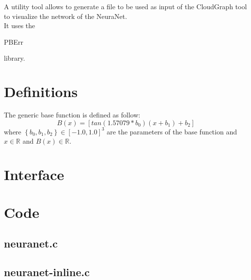 A utility tool allows to generate a file to be used as input of the CloudGraph tool to visualize the network of the NeuraNet.\\

It uses the \begin{ttfamily}PBErr\end{ttfamily} library.\\

\section{Definitions}

The generic base function is defined as follow:\\
\begin{equation}
B(x)=\left[tan(1.57079*b_0)(x+b_1)+b_2\right]
\end{equation}
where $\left\lbrace b_0,b_1,b_2\right\rbrace\in[-1.0,1.0]^3$ are the parameters of the base function and $x\in\mathbb{R}$ and $B(x)\in\mathbb{R}$.

\section{Interface}

\begin{scriptsize}
\begin{ttfamily}

\end{ttfamily}
\end{scriptsize}

\section{Code}

\subsection{neuranet.c}

\begin{scriptsize}
\begin{ttfamily}

\end{ttfamily}
\end{scriptsize}

\subsection{neuranet-inline.c}

